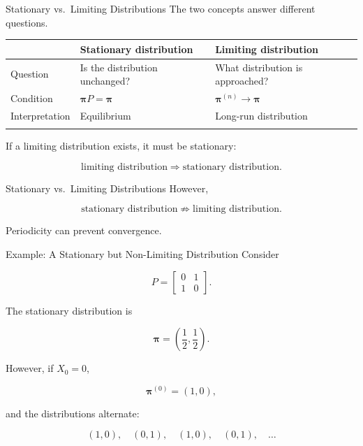 \documentclass[
  ignorenonframetext,
  aspectratio=169,
]{beamer}
\newcounter{none} %
\begin{document}
\begin{frame}{Stationary vs.~Limiting Distributions}
\protect{}\label{stationary-vs.-limiting-distributions-1}
The two concepts answer different questions.

{\def\LTcaptype{none} %
\begin{longtable}[]{@{}
  >{\raggedright\arraybackslash}p{}
  >{\raggedright\arraybackslash}p{}
  >{\raggedright\arraybackslash}p{}@{}}
\toprule\noalign{}
\begin{minipage}[b]{\linewidth}\raggedright
\end{minipage} & \begin{minipage}[b]{\linewidth}\raggedright
Stationary distribution
\end{minipage} & \begin{minipage}[b]{\linewidth}\raggedright
Limiting distribution
\end{minipage} \\
\midrule\noalign{}
\endhead
Question & Is the distribution unchanged? & What distribution is
approached? \\
Condition & \(\boldsymbol{\pi}P=\boldsymbol{\pi}\) &
\(\boldsymbol{\pi}^{(n)}\to\boldsymbol{\pi}\) \\
Interpretation & Equilibrium & Long-run distribution \\
\bottomrule\noalign{}
\end{longtable}
}

If a limiting distribution exists, it must be stationary:

\[
\boxed{
\text{limiting distribution}
\Longrightarrow
\text{stationary distribution}.
}
\]
\end{frame}

\begin{frame}{Stationary vs.~Limiting Distributions}
\protect{}\label{stationary-vs.-limiting-distributions-2}
However,

\[
\boxed{
\text{stationary distribution}
\not\Longrightarrow
\text{limiting distribution}.
}
\]

Periodicity can prevent convergence.
\end{frame}

\begin{frame}{Example: A Stationary but Non-Limiting Distribution}
\protect{}\label{example-a-stationary-but-non-limiting-distribution}
Consider

\[
P=
\begin{bmatrix}
0&1\\
1&0
\end{bmatrix}.
\]

The stationary distribution is

\[
\boldsymbol{\pi}
=
\left(\frac12,\frac12\right).
\]

However, if \(X_0=0\),

\[
\boldsymbol{\pi}^{(0)}=(1,0),
\]

and the distributions alternate:

\[
(1,0),\quad
(0,1),\quad
(1,0),\quad
(0,1),\quad\ldots
\]
\end{frame}
\end{document}
